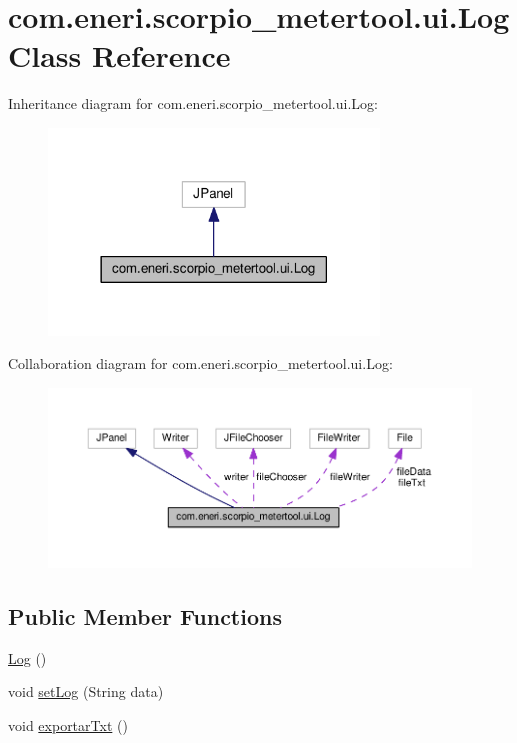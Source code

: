 \hypertarget{classcom_1_1eneri_1_1scorpio__metertool_1_1ui_1_1_log}{}\section{com.\+eneri.\+scorpio\+\_\+metertool.\+ui.\+Log Class Reference}
\label{classcom_1_1eneri_1_1scorpio__metertool_1_1ui_1_1_log}


Inheritance diagram for com.\+eneri.\+scorpio\+\_\+metertool.\+ui.\+Log\+:
\nopagebreak
\begin{figure}[H]
\begin{center}
\leavevmode
\includegraphics[width=249pt]{classcom_1_1eneri_1_1scorpio__metertool_1_1ui_1_1_log__inherit__graph}
\end{center}
\end{figure}


Collaboration diagram for com.\+eneri.\+scorpio\+\_\+metertool.\+ui.\+Log\+:
\nopagebreak
\begin{figure}[H]
\begin{center}
\leavevmode
\includegraphics[width=350pt]{classcom_1_1eneri_1_1scorpio__metertool_1_1ui_1_1_log__coll__graph}
\end{center}
\end{figure}
\subsection*{Public Member Functions}
\begin{DoxyCompactItemize}
\item 
\hyperlink{classcom_1_1eneri_1_1scorpio__metertool_1_1ui_1_1_log_a8a1bc533a22dfa6e5c6a50868ad8cf4d}{Log} ()
\item 
void \hyperlink{classcom_1_1eneri_1_1scorpio__metertool_1_1ui_1_1_log_aea22f3d6420aa4f36573aafe855fc08e}{set\+Log} (String data)
\item 
void \hyperlink{classcom_1_1eneri_1_1scorpio__metertool_1_1ui_1_1_log_a8e2117efd7a0284a440f5c3a9c995ebd}{exportar\+Txt} ()
\end{DoxyCompactItemize}

